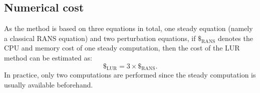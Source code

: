 \subsection{Numerical cost}
As the method is based on three equations in total, one steady equation 
(namely a classical RANS equation) and two perturbation equations, 
if $\mathdollar_{\text{RANS}}$ 
denotes the CPU and memory cost of
one steady computation, then the cost of the LUR
method can be estimated as:
\begin{equation}
	\mathdollar_{\text{LUR}} = 3 \times \mathdollar_{\text{RANS}}.
\end{equation}
In practice, only two computations are performed since the steady computation
is usually available beforehand.
